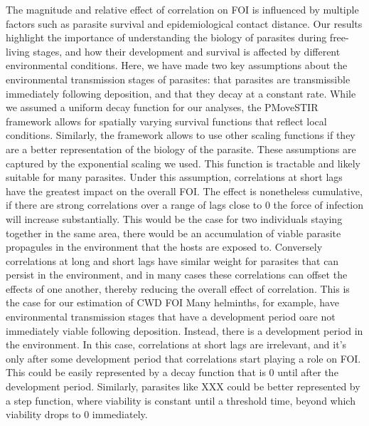 \documentclass[letterpaper]{article}
\begin{document}
The magnitude and relative effect of correlation on FOI is influenced by multiple factors such as parasite survival and epidemiological contact distance. 
Our results highlight the importance of understanding the biology of parasites during free-living stages, and how their development and survival is affected by different environmental conditions. Here, we have made two key assumptions about the environmental transmission stages of parasites: that parasites are transmissible immediately following deposition, and that they decay at a constant rate. While we assumed a uniform decay function for our analyses, the PMoveSTIR framework allows for spatially varying survival functions that reflect local conditions. Similarly, the framework allows to use other scaling functions if they are a better representation of the biology of the parasite. 
These assumptions are captured by the exponential scaling we used. This function is tractable and likely suitable for many parasites. Under this assumption, correlations at short lags have the greatest impact on the overall FOI. The effect is nonetheless cumulative, if there are strong correlations over a range of lags close to 0 the force of infection will increase substantially. This would be the case for two individuals staying together in the same area, there would be an accumulation of viable parasite propagules in the environment that the hosts are exposed to. Conversely correlations at long and short lags have similar weight for parasites that can persist in the environment, and in many cases these correlations can offset the effects of one another, thereby reducing the overall effect of correlation. This is the case for our estimation of CWD FOI
Many helminths, for example, have environmental transmission stages that have a development period oare not immediately viable following deposition. Instead, there is a development period in the environment. In this case, correlations at short lags are irrelevant, and it's only after some development period that correlations start playing a role on FOI. This could be easily represented by a decay function that is 0 until after the development period. Similarly, parasites like XXX could be better represented by a step function, where viability is constant until a threshold time, beyond which viability drops to 0 immediately. 
\end{document}

